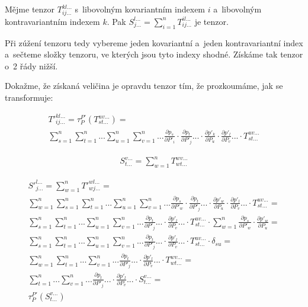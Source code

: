 \begin{fact}
Mějme tenzor \(T_{ij...}^{kl...}\) s~libovolným kovariantním indexem \(i\) a~libovolným kontravariantním indexem \(k\). Pak \(S_{j...}^{l...} = \sum_{i=1}^n T_{ij...}^{il...}\) je tenzor.
\end{fact}

Při zúžení tenzoru tedy vybereme jeden kovariantní a~jeden kontravariantní index a~sečteme složky tenzoru, ve kterých jsou tyto indexy shodné. Získáme tak tenzor o~2 řády nižší.

Dokažme, že získaná veličina je opravdu tenzor tím, že prozkoumáme, jak se transformuje:

\begin{equation}
\begin{split}
T'^{kl...}_{ij...} = \tau_P^{P'} (T_{st...}^{uv...}) = \\
\sum_{s=1}^n \sum_{t=1}^n ... \sum_{u=1}^n \sum_{v=1}^n ... \frac{\partial p_s}{\partial P'_i} \cdot \frac{\partial p_t}{\partial P'_j} ... \cdot \frac{\partial p'_k}{\partial P_u} \cdot \frac{\partial p'_l}{\partial P_v} ... \cdot T_{st...}^{uv...}
\end{split}
\end{equation}

\begin{equation}
\begin{split}
S_{t...}^{v...} = \sum_{w=1}^n T_{wt...}^{wv...}
\end{split}
\end{equation}

\begin{equation}
\begin{split}
S'^{l...}_{j...} = \sum_{w=1}^n T'^{wl...}_{wj...} = \\
\sum_{w=1}^n \sum_{s=1}^n \sum_{t=1}^n ... \sum_{u=1}^n \sum_{v=1}^n ... \frac{\partial p_s}{\partial P'_w} \cdot \frac{\partial p_t}{\partial P'_j} ... \cdot \frac{\partial p'_w}{\partial P_u} \cdot \frac{\partial p'_l}{\partial P_v} ... \cdot T_{st...}^{uv...} = \\
\sum_{s=1}^n \sum_{t=1}^n ... \sum_{u=1}^n \sum_{v=1}^n ... \frac{\partial p_t}{\partial P'_j} ... \cdot \frac{\partial p'_l}{\partial P_v} ... \cdot T_{st...}^{uv...} \cdot \sum_{w=1}^n \frac{\partial p_s}{\partial P'_w} \cdot \frac{\partial p'_w}{\partial P_u} = \\
\sum_{s=1}^n \sum_{t=1}^n ... \sum_{u=1}^n \sum_{v=1}^n ... \frac{\partial p_t}{\partial P'_j} ... \cdot \frac{\partial p'_l}{\partial P_v} ... \cdot T_{st...}^{uv...} \cdot \delta_{su} = \\
\sum_{w=1}^n \sum_{t=1}^n ... \sum_{v=1}^n ... \frac{\partial p_t}{\partial P'_j} ... \cdot \frac{\partial p'_l}{\partial P_v} ... \cdot T_{wt...}^{wv...} = \\
\sum_{t=1}^n ... \sum_{v=1}^n ... \frac{\partial p_t}{\partial P'_j} ... \cdot \frac{\partial p'_l}{\partial P_v} ... \cdot S_{t...}^{v...} = \\
\tau_P^{P'} (S_{t...}^{v...})
\end{split}
\end{equation}

